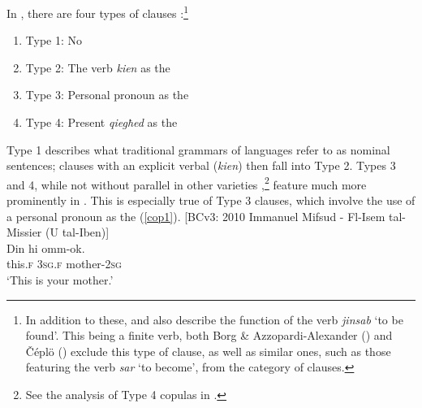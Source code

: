 \documentclass[output=paper]{langsci/langscibook}
\begin{document}
 \label{Copular} %
In , there are four types of  clauses \citep[53]{BorgAzzopardi-Alexander1997}:\footnote{In addition to these, \cite{Borg1987} and \cite{borgspagnol2015} also describe the  function of the verb \textit{jinsab} `to be found'. This being a finite verb, both Borg \& Azzopardi-Alexander (\citeyear[53]{BorgAzzopardi-Alexander1997}) and Čéplö (\citeyear[99--104]{bulbul2018}) exclude this type of clause, as well as similar ones, such as those featuring the verb \textit{sar} `to become', from the category of  clauses.}
\begin{enumerate}[noitemsep]
	\item[] Type 1: No 
    \item[] Type 2: The verb \textit{kien} as the 
	\item[] Type 3: Personal pronoun as the 

	\item[] Type 4: Present  \textit{qiegħed} as the 
\end{enumerate}
Type 1 describes what traditional grammars of  languages refer to as nominal sentences;  clauses with an explicit verbal  (\textit{kien}) then fall into Type 2. Types 3 and 4, while not without parallel in other varieties ,\footnote{See the analysis of Type 4 copulas in \cite{camillerisadler2018}.} feature much more prominently in . This is especially true of Type 3  clauses, which involve the use of a personal pronoun as the  (\ref{cop1}).
\ea\label{cop1}
{[BCv3: 2010 Immanuel Mifsud - Fl-Isem tal-Missier (U tal-Iben)]}\\
\gll Din hi omm-ok.\\
	this.\textsc{f} \textsc{3sg.f} mother-\textsc{2sg}\\
	\glt `This is your mother.'\\
\z
\end{document}
